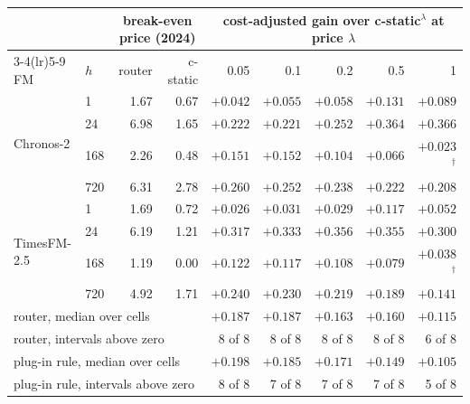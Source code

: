\begin{tabular}{llrrrrrrr}
\toprule
 & & \multicolumn{2}{c}{break-even price (2024)} & \multicolumn{5}{c}{cost-adjusted gain over c-static$^{\lambda}$ at price $\lambda$} \\
\cmidrule(lr){3-4}\cmidrule(lr){5-9}
FM & $h$ & router & c-static & 0.05 & 0.1 & 0.2 & 0.5 & 1 \\
\midrule
\multirow{4}{*}{Chronos-2}
 & 1 & 1.67 & 0.67 & $+0.042$ & $+0.055$ & $+0.058$ & $+0.131$ & $+0.089$ \\
 & 24 & 6.98 & 1.65 & $+0.222$ & $+0.221$ & $+0.252$ & $+0.364$ & $+0.366$ \\
 & 168 & 2.26 & 0.48 & $+0.151$ & $+0.152$ & $+0.104$ & $+0.066$ & $+0.023$$^{\dagger}$ \\
 & 720 & 6.31 & 2.78 & $+0.260$ & $+0.252$ & $+0.238$ & $+0.222$ & $+0.208$ \\
\midrule
\multirow{4}{*}{TimesFM-2.5}
 & 1 & 1.69 & 0.72 & $+0.026$ & $+0.031$ & $+0.029$ & $+0.117$ & $+0.052$ \\
 & 24 & 6.19 & 1.21 & $+0.317$ & $+0.333$ & $+0.356$ & $+0.355$ & $+0.300$ \\
 & 168 & 1.19 & 0.00 & $+0.122$ & $+0.117$ & $+0.108$ & $+0.079$ & $+0.038$$^{\dagger}$ \\
 & 720 & 4.92 & 1.71 & $+0.240$ & $+0.230$ & $+0.219$ & $+0.189$ & $+0.141$ \\
\midrule
\multicolumn{4}{l}{router, median over cells} & $+0.187$ & $+0.187$ & $+0.163$ & $+0.160$ & $+0.115$ \\
\multicolumn{4}{l}{router, intervals above zero} & 8 of 8 & 8 of 8 & 8 of 8 & 8 of 8 & 6 of 8 \\
\multicolumn{4}{l}{plug-in rule, median over cells} & $+0.198$ & $+0.185$ & $+0.171$ & $+0.149$ & $+0.105$ \\
\multicolumn{4}{l}{plug-in rule, intervals above zero} & 8 of 8 & 7 of 8 & 7 of 8 & 7 of 8 & 5 of 8 \\
\bottomrule
\end{tabular}
